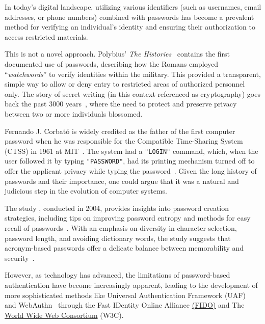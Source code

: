 In today's digital landscape, utilizing various identifiers (such as usernames,
email addresses, or phone numbers) combined with passwords has become a
prevalent method for verifying an individual's identity and ensuring their
authorization to access restricted materials.

This is not a novel approach.
Polybius' \textit{The Histories}~\cite{perseus_tufts} contains the first
documented use of passwords, describing how the Romans employed
``\textit{watchwords}'' to verify identities within the military.
This provided a transparent, simple way to allow or deny entry to restricted
areas of authorized personnel only.
The story of secret writing (in this context referenced as cryptography) goes
back the past 3000 years~\cite{history_cryptography_cryptanalysis}, where the
need to protect and preserve privacy between two or more individuals blossomed.

Fernando J. Corbató is widely credited as the father of the first
computer password when he was responsible for the Compatible Time-Sharing
System (CTSS) in 1961 at MIT~\cite{levy1984hackers}.
The system had a \texttt{"LOGIN"} command, which, when the user followed it by
typing \texttt{"PASSWORD"}, had its printing mechanism turned off to offer
the applicant privacy while typing the password~\cite{ctss_programmers_guide}.
Given the long history of passwords and their importance, one could argue that
it was a natural and judicious step in the evolution of computer systems.

The study , conducted in
2004, provides insights into password creation strategies, including tips on
improving password entropy and methods for easy recall of passwords~\cite{
    yan2000password}.
With an emphasis on diversity in character selection, password length, and
avoiding dictionary words, the study suggests that acronym-based passwords offer
a delicate balance between memorability and security~\cite{yan2000password}.

However, as technology has advanced, the limitations of password-based
authentication have become increasingly apparent, leading to the development of
more sophisticated methods like Universal Authentication Framework
(UAF)~\cite{fido_uaf_overview} and WebAuthn~\cite{webauthn_level_2} through the
Fast IDentity Online Alliance \href{https://fidoalliance.org}{(FIDO)} and
The \href{https://www.w3.org}{World Wide Web Consortium} (W3C).

\newcommand{\assymetricCrypto}{\footnote{Asymmetric cryptography uses a
key-pair consisting of public and private keys. The public key encrypts data,
while the private key decrypts it. The keys are mathematically related, but
    deriving one from the other is infeasible, ensuring secure communication and
    data exchange.}}

